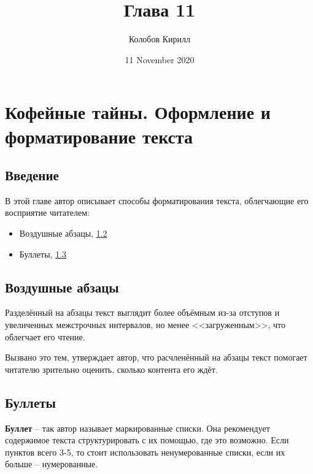 \documentclass[a4paper,12pt]{report}
\author{Колобов Кирилл}
\title{Глава 11}
\date{11 November 2020}
\begin{document}
\setcounter{chapter}{10}
\chapter{Кофейные тайны. Оформление и форматирование текста}
\section{Введение}
В этой главе автор описывает способы форматирования текста, облегчающие его восприятие читателем: 
\begin{itemize}
    \item{Воздушные абзацы, \ref{air-par:main}}
    \item{Буллеты, \ref{bullet}}
\end{itemize}

\section{Воздушные абзацы}\label{air-par:main}
Разделённый на абзацы текст выглядит более объёмным из-за отступов и увеличенных межстрочных интервалов, но менее <<загруженным>>, что облегчает его чтение. 

Вызвано это тем, утверждает автор, что расчленённый на абзацы текст помогает читателю зрительно оценить, сколько контента его ждёт. 

\section{Буллеты}\label{bullet}
\textbf{Буллет} -- так автор называет маркированные списки. 
Она рекомендует содержимое текста структурировать с их помощью, где это возможно.
Если пунктов всего 3-5, то стоит использовать ненумерованные списки, 
если их больше -- нумерованные.

\tableofcontents
\end{document}
